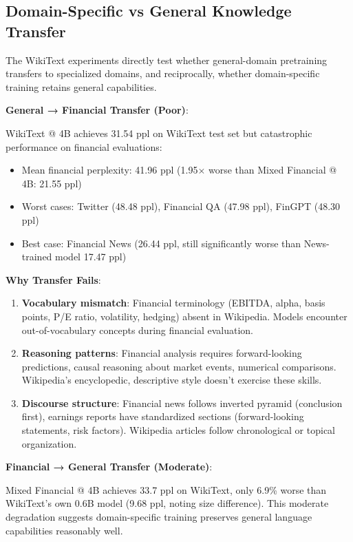 \subsection{Domain-Specific vs General Knowledge Transfer}

The WikiText experiments directly test whether general-domain pretraining transfers to specialized domains, and reciprocally, whether domain-specific training retains general capabilities.

\textbf{General → Financial Transfer (Poor)}:

WikiText @ 4B achieves 31.54 ppl on WikiText test set but catastrophic performance on financial evaluations:
\begin{itemize}
\item Mean financial perplexity: 41.96 ppl (1.95$\times$ worse than Mixed Financial @ 4B: 21.55 ppl)
\item Worst cases: Twitter (48.48 ppl), Financial QA (47.98 ppl), FinGPT (48.30 ppl)
\item Best case: Financial News (26.44 ppl, still significantly worse than News-trained model 17.47 ppl)
\end{itemize}

\textbf{Why Transfer Fails}:
\begin{enumerate}
\item \textbf{Vocabulary mismatch}: Financial terminology (EBITDA, alpha, basis points, P/E ratio, volatility, hedging) absent in Wikipedia. Models encounter out-of-vocabulary concepts during financial evaluation.
\item \textbf{Reasoning patterns}: Financial analysis requires forward-looking predictions, causal reasoning about market events, numerical comparisons. Wikipedia's encyclopedic, descriptive style doesn't exercise these skills.
\item \textbf{Discourse structure}: Financial news follows inverted pyramid (conclusion first), earnings reports have standardized sections (forward-looking statements, risk factors). Wikipedia articles follow chronological or topical organization.
\end{enumerate}

\textbf{Financial → General Transfer (Moderate)}:

Mixed Financial @ 4B achieves 33.7 ppl on WikiText, only 6.9\% worse than WikiText's own 0.6B model (9.68 ppl, noting size difference). This moderate degradation suggests domain-specific training preserves general language capabilities reasonably well.

